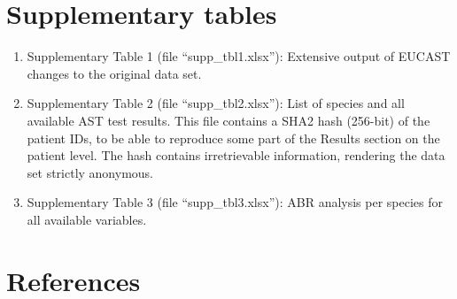 \documentclass[
]{book}
\providecommand{\tightlist}{%
  \setlength{\itemsep}{0pt}\setlength{\parskip}{0pt}}
\begin{document}
\hypertarget{supplementary-tables}{%
\section*{Supplementary tables}\label{supplementary-tables}}

\begin{enumerate}
\def\labelenumi{\arabic{enumi}.}
\tightlist
\item
  Supplementary Table 1 (file ``supp\_tbl1.xlsx''): Extensive output of EUCAST changes to the original data set.
\item
  Supplementary Table 2 (file ``supp\_tbl2.xlsx''): List of species and all available AST test results. This file contains a SHA2 hash (256-bit) of the patient IDs, to be able to reproduce some part of the Results section on the patient level. The hash contains irretrievable information, rendering the data set strictly anonymous.
\item
  Supplementary Table 3 (file ``supp\_tbl3.xlsx''): ABR analysis per species for all available variables.
\end{enumerate}

\hypertarget{references-6}{%
\section*{References}\label{references-6}}
\end{document}

